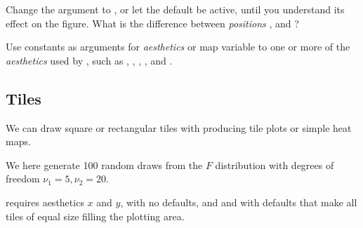 \documentclass[krantz2]{krantz}\usepackage{knitr}%
\begin{document}
\begin{playground}
Change the argument to , or let the default be active, until you understand its effect on the figure. What is the difference between \emph{positions} ,  and ?
\end{playground}

\begin{playground}
Use constants as arguments for \emph{aesthetics} or map variable  to one or more of the \emph{aesthetics} used by , such as , , , ,  and .
\end{playground}


\subsection{Tiles}\label{sec:tileplot}
We can draw square or rectangular tiles with  producing tile plots or simple heat maps.

We here generate 100 random draws from the $F$ distribution with degrees of freedom $\nu_1 = 5, \nu_2 = 20$.

\begin{knitrout}\footnotesize
{}\color{fgcolor}\begin{kframe}
\begin{alltt}
\hlstd{(}\hlstd{)}
 \hlkwb{<-} \hlstd{(} \hlstd{=} \hlstd{(}\hlstd{,}  \hlstd{=} \hlstd{,}  \hlstd{=} \hlstd{),}
                          \hlstd{=} \hlstd{(letters[}\hlopt{:}\hlstd{],} \hlstd{),}
                          \hlstd{= LETTERS[}\hlstd{(}\hlopt{:}\hlstd{,} \hlstd{(}\hlstd{,} \hlstd{))])}
\end{alltt}
\end{kframe}
\end{knitrout}

 requires aesthetics $x$ and $y$, with no defaults, and  and  with defaults that make all tiles of equal size filling the plotting area.
\end{document}
